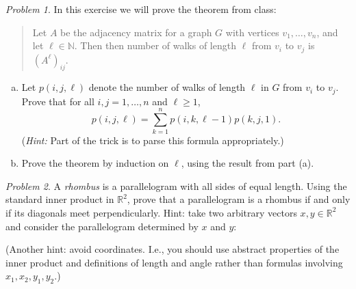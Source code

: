 \documentclass[11pt,twoside]{amsart}
\theoremstyle{plain}
\theoremstyle{remark}
\newtheorem{prob}{Problem}
\theoremstyle{definition}
\theoremstyle{definition}
\newcommand{\R}{\mathbb{R}}
\newcommand{\NN}{\mathbb{N}}
\begin{document}
\begin{prob}
In this exercise we will prove the theorem from class: 

\begin{quote}
Let $A$ be the adjacency matrix for a graph $G$ with vertices $v_1, \dots , v_n$, and let $\ell \in \NN$. Then then number of walks of length $\ell$ from $v_i$ to $v_j$ is $(A^\ell)_{ij}$.
\end{quote}

\begin{enumerate}[(a)]
 \item Let $p(i,j,\ell)$ denote the number of walks of length $\ell$ in $G$ from $v_i$ to $v_j$. Prove that for all $i,j=1,\dots, n$ and $\ell \geq 1$,
  \[p(i,j,\ell)=\sum _{k=1}^n p(i,k,\ell -1) p(k,j,1).\]
  (\emph{Hint:} Part of the trick is to parse this formula appropriately.)
  \item Prove the theorem by induction on $\ell$, using the result from part (a).
\end{enumerate}
\end{prob}

\begin{prob}
A {\em rhombus} is a parallelogram with all sides of equal length.
    Using the standard inner product in $\R^2$, prove that a parallelogram is a
    rhombus if and only if its diagonals meet perpendicularly. Hint: take two
    arbitrary vectors $x,y\in \R^2$ and consider the parallelogram determined by
    $x$ and $y$:
    \begin{center}
    \end{center}
    (Another hint: avoid coordinates. I.e., you should use abstract properties of
    the inner product and definitions of length and angle rather than formulas
    involving~$x_1,x_2,y_1,y_2$.)
\end{prob}

\end{document}
